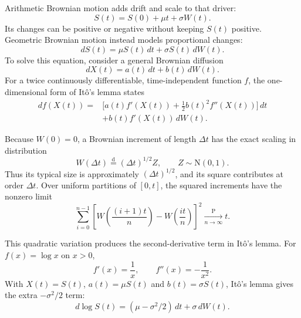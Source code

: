 \documentclass[12pt,a4paper]{article}
\numberwithin{equation}{section}
\numberwithin{table}{section}
\numberwithin{figure}{section}
\begin{document}
Arithmetic Brownian motion adds drift and scale to that driver:
\begin{equation}\label{eq:arithmetic-brownian}
S(t)=S(0)+\mu t+\sigma W(t).
\end{equation}
Its changes can be positive or negative without keeping $S(t)$ positive. Geometric Brownian motion instead models proportional changes:
\begin{equation}\label{eq:geometric-brownian}
dS(t)=\mu S(t)\,dt+\sigma S(t)\,dW(t).
\end{equation}
To solve this equation, consider a general Brownian diffusion
\begin{equation}\label{eq:ito-diffusion}
dX(t)=a(t)\,dt+b(t)\,dW(t).
\end{equation}
For a twice continuously differentiable, time-independent function $f$, the one-dimensional form of It\^o's lemma states
\begin{equation}\label{eq:ito-lemma}
\begin{aligned}
d f(X(t))={}&
\bigl[a(t)f'(X(t))+\tfrac12 b(t)^2 f''(X(t))\bigr]\,dt \\
&+b(t)f'(X(t))\,dW(t).
\end{aligned}
\end{equation}
\begin{samepage}
Because $W(0)=0$, a Brownian increment of length $\Delta t$ has the exact scaling in distribution
\begin{equation}\label{eq:brownian-small-increment}
W(\Delta t)\overset{\mathrm{d}}{=}(\Delta t)^{1/2}Z,
\qquad Z\sim\mathrm{N}(0,1).
\end{equation}
Thus its typical size is approximately $(\Delta t)^{1/2}$, and its square contributes at order $\Delta t$. Over uniform partitions of $[0,t]$, the squared increments have the nonzero limit
\begin{equation}\label{eq:brownian-quadratic-variation}
\sum_{i=0}^{n-1}\left[W\!\left(\frac{(i+1)t}{n}\right)
-W\!\left(\frac{it}{n}\right)\right]^2
\xrightarrow[n\to\infty]{\mathrm{P}}t.
\end{equation}
\end{samepage}
This quadratic variation produces the second-derivative term in It\^o's lemma. For $f(x)=\log x$ on $x>0$,
\begin{equation}\label{eq:log-derivatives}
f'(x)=\frac{1}{x},\qquad f''(x)=-\frac{1}{x^2}.
\end{equation}
With $X(t)=S(t)$, $a(t)=\mu S(t)$ and $b(t)=\sigma S(t)$, It\^o's lemma gives the extra $-\sigma^2/2$ term:
\begin{equation}\label{eq:geometric-brownian-log}
d\log S(t)=(\mu-\sigma^2/2)\,dt+\sigma\,dW(t).
\end{equation}
\end{document}
